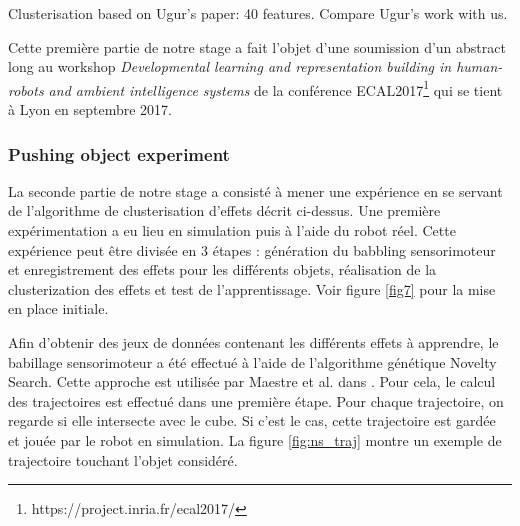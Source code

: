 \documentclass{llncs}
\newcommand*\circled[1]{\tikz[baseline=(char.base)]{
            \node[shape=circle,draw,inner sep=2pt] (char) {#1};}}
\begin{document}
Clusterisation based on Ugur's paper: 40 features. Compare Ugur's work with us.

Cette première partie de notre stage a fait l'objet d'une soumission d'un abstract long au workshop \textit{Developmental learning and representation building in human-robots and ambient intelligence systems} de la conférence ECAL2017\footnote{https://project.inria.fr/ecal2017/} qui se tient à Lyon en septembre 2017.



\subsubsection{Pushing object experiment}
La seconde partie de notre stage a consisté à mener une expérience en se servant de l'algorithme de clusterisation d'effets décrit ci-dessus. Une première expérimentation a eu lieu en simulation puis à l'aide du robot réel. Cette expérience peut être divisée en 3 étapes : \circled{1} génération du babbling sensorimoteur et enregistrement des effets pour les différents objets, \circled{2} réalisation de la clusterization des effets et \circled{3} test de l'apprentissage.  Voir figure \ref{fig7} pour la mise en place initiale.

Afin d'obtenir des jeux de données contenant les différents effets à apprendre, le babillage sensorimoteur a été effectué à l'aide de l'algorithme génétique Novelty Search\cite{5949955}. Cette approche est utilisée par Maestre et al. dans \cite{Maestre2015}. Pour cela, le calcul des trajectoires est effectué dans une première étape. Pour chaque trajectoire, on regarde si elle intersecte avec le cube. Si c'est le cas, cette trajectoire est gardée et jouée par le robot en simulation. La figure \ref{fig:ns_traj} montre un exemple de trajectoire touchant l'objet considéré.
\end{document}
